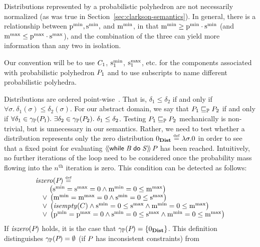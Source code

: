 Distributions represented by a probabilistic polyhedron
are not necessarily normalized (as was true in
Section~\ref{sec:clarkson-semantics}).  In general, there is a
relationship between $\mathrm{p}^\mathrm{min}_{}, \mathrm{s}^\mathrm{min}_{}, $ and $\mathrm{m}^\mathrm{min}_{}$, in that
$\mathrm{m}^\mathrm{min}_{} \geq \mathrm{p}^\mathrm{min}_{} \cdot \mathrm{s}^\mathrm{min}_{}$ (and $\mathrm{m}^\mathrm{max}_{} \leq \mathrm{p}^\mathrm{max}_{} \cdot
\mathrm{s}^\mathrm{max}_{}$), and the combination of the three can yield more information
than any two in isolation.

Our convention will be to use $C_{1}$, $\mathrm{s}^\mathrm{min}_{1}$, $\mathrm{s}^\mathrm{max}_{1}$,
etc. for the components associated with probabilistic polyhedron
$P_{1}$ and to use subscripts to name different probabilistic
polyhedra.

Distributions are ordered point-wise~\cite{clarkson09quantifying}.
That is, $\delta_1 \leq \delta_2$ if and only if $\forall
\sigma.\ \delta_1(\sigma) \leq \delta_2(\sigma)$.  For
our abstract domain, we say that $P_{1} \sqsubseteq_{\mathbb{P}} P_{2}$ if and only if
$\forall \delta_1 \in \gamma_{\mathbb{P}}(P_{1}).\ \exists \delta_2 \in
\gamma_{\mathbb{P}}(P_{2}).\ \delta_1 \leq \delta_2$.  Testing $P_{1} \sqsubseteq_{\mathbb{P}}
P_{2}$ mechanically is non-trivial, but is unnecessary in our
semantics.  Rather, we need to test whether a distribution
represents only the zero distribution $0_{\textbf{Dist}} \stackrel{\smash{\scriptscriptstyle \mathrm{def}}}= \lambda
\sigma. 0$ in order to see that a fixed point for evaluating
$\langle\!\langle{\mathsf{while}\;{\mathit{B}}\;\mathsf{do}\;{\mathit{S}}}\rangle\!\rangle\,{P_{}}$ has been reached.
Intuitively, no further iterations of the loop need to be considered
once the probability mass flowing into the $n^\text{th}$ iteration is
zero. This condition can be detected as follows:
\[
\begin{array}{l}
\mathit{iszero}(P_{}) \stackrel{\smash{\scriptscriptstyle \mathrm{def}}}= \\
\qquad \left( \mathrm{s}^\mathrm{min}_{} = \mathrm{s}^\mathrm{max}_{} = 0 \wedge \mathrm{m}^\mathrm{min}_{} = 0 \leq \mathrm{m}^\mathrm{max}_{} \right) \\
\quad \vee\; \left( \mathrm{m}^\mathrm{min}_{} = \mathrm{m}^\mathrm{max}_{} = 0 \wedge \mathrm{s}^\mathrm{min}_{} = 0 \leq \mathrm{s}^\mathrm{max}_{} \right) \\
\quad \vee\; \left( \mathit{isempty}(C) \wedge \mathrm{s}^\mathrm{min}_{} = 0 \leq \mathrm{s}^\mathrm{max}_{} \wedge
\mathrm{m}^\mathrm{min}_{} = 0 \leq \mathrm{m}^\mathrm{max}_{} \right) \\
\quad \vee\; \left( \mathrm{p}^\mathrm{min}_{} = \mathrm{p}^\mathrm{max}_{} = 0 \wedge \mathrm{s}^\mathrm{min}_{} = 0 \leq \mathrm{s}^\mathrm{max}_{} \wedge
\mathrm{m}^\mathrm{min}_{} = 0 \leq \mathrm{m}^\mathrm{max}_{} \right) \\
\end{array}
\]
If $ \mathit{iszero}(P_{}) $ holds, it is the case that $ \gamma_{\mathbb{P}}(P_{}) =
\left\{ 0_{\textbf{Dist}} \right\} $.  This definition distinguishes $\gamma_{\mathbb{P}}(P_{}) =
\emptyset $ (if $ P_{} $ has inconsistent constraints) from 
